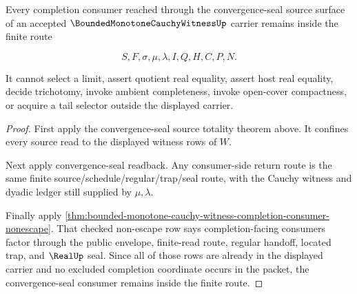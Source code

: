 \begin{theorem}
\label{thm:bounded-monotone-cauchy-witness-convergence-seal-nonescape}
Every completion consumer reached through the convergence-seal source surface of an accepted $\BoundedMonotoneCauchyWitnessUp$ carrier remains inside the finite route

$$
S,F,\sigma,\mu,\lambda,I,Q,H,C,P,N.
$$

It cannot select a limit, assert quotient real equality, assert host real equality, decide trichotomy, invoke ambient completeness, invoke open-cover compactness, or acquire a tail selector outside the displayed carrier.
\end{theorem}
\begin{proof}
First apply the convergence-seal source totality theorem above. It confines every source read to the displayed witness rows of $W$.

Next apply convergence-seal readback. Any consumer-side return route is the same finite source/schedule/regular/trap/seal route, with the Cauchy witness and dyadic ledger still supplied by $\mu,\lambda$.

Finally apply \autoref{thm:bounded-monotone-cauchy-witness-completion-consumer-nonescape}. That checked non-escape row says completion-facing consumers factor through the public envelope, finite-read route, regular handoff, located trap, and $\RealUp$ seal. Since all of those rows are already in the displayed carrier and no excluded completion coordinate occurs in the packet, the convergence-seal consumer remains inside the finite route.
\end{proof}

